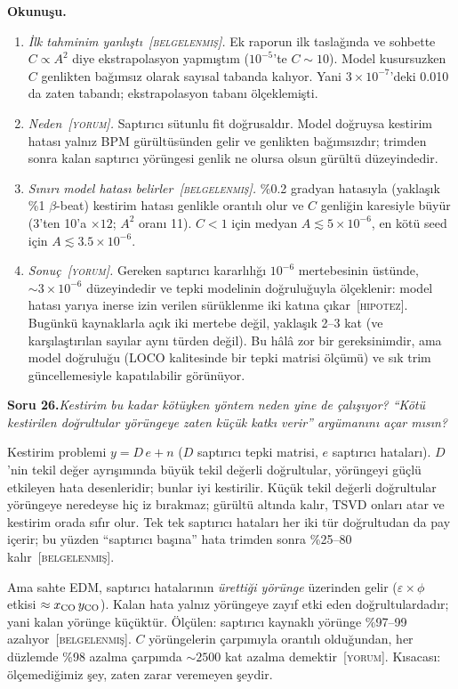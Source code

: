 \documentclass[11pt,a4paper]{article}
\newcommand{\BEL}{\textsc{[belgelenmiş]}}
\newcommand{\YOR}{\textsc{[yorum]}}
\newcommand{\HIP}{\textsc{[hipotez]}}
\newcounter{soru}
\newcommand{\soru}[2]{%
  \par\medskip\noindent\textbf{Soru #1.}\enspace\textit{#2}\par\nopagebreak\smallskip}
\begin{document}
\textbf{Okunuşu.}
\begin{enumerate}[nosep]
\item \emph{İlk tahminim yanlıştı~\BEL.} Ek raporun ilk taslağında ve sohbette $C\propto A^2$ diye
ekstrapolasyon yapmıştım ($10^{-5}$'te $C\sim10$). Model kusursuzken $C$ genlikten bağımsız olarak sayısal
tabanda kalıyor. Yani $3\times10^{-7}$'deki 0.010 da zaten tabandı; ekstrapolasyon tabanı ölçeklemişti.
\item \emph{Neden~\YOR.} Saptırıcı sütunlu fit doğrusaldır. Model doğruysa kestirim hatası yalnız BPM
gürültüsünden gelir ve genlikten bağımsızdır; trimden sonra kalan saptırıcı yörüngesi genlik ne olursa olsun
gürültü düzeyindedir.
\item \emph{Sınırı model hatası belirler~\BEL.} \%0.2 gradyan hatasıyla (yaklaşık \%1 $\beta$-beat) kestirim
hatası genlikle orantılı olur ve $C$ genliğin karesiyle büyür (3'ten 10'a $\times12$; $A^2$ oranı 11).
$C<1$ için medyan $A\lesssim5\times10^{-6}$, en kötü seed için $A\lesssim3.5\times10^{-6}$.
\item \emph{Sonuç~\YOR.} Gereken saptırıcı kararlılığı $10^{-6}$ mertebesinin üstünde, $\sim3\times10^{-6}$
düzeyindedir ve tepki modelinin doğruluğuyla ölçeklenir: model hatası yarıya inerse izin verilen sürüklenme
iki katına çıkar~\HIP. Bugünkü kaynaklarla açık iki mertebe değil, yaklaşık 2--3 kat (ve karşılaştırılan
sayılar aynı türden değil). Bu hâlâ zor bir gereksinimdir, ama model doğruluğu (LOCO kalitesinde bir tepki
matrisi ölçümü) ve sık trim güncellemesiyle kapatılabilir görünüyor.
\end{enumerate}

\soru{26}{Kestirim bu kadar kötüyken yöntem neden yine de çalışıyor? ``Kötü kestirilen doğrultular
yörüngeye zaten küçük katkı verir'' argümanını açar mısın?}

Kestirim problemi $y=D\,e+n$ ($D$ saptırıcı tepki matrisi, $e$ saptırıcı hataları). $D$'nin tekil değer
ayrışımında büyük tekil değerli doğrultular, yörüngeyi güçlü etkileyen hata desenleridir; bunlar iyi
kestirilir. Küçük tekil değerli doğrultular yörüngeye neredeyse hiç iz bırakmaz; gürültü altında kalır,
TSVD onları atar ve kestirim orada sıfır olur. Tek tek saptırıcı hataları her iki tür doğrultudan da pay
içerir; bu yüzden ``saptırıcı başına'' hata trimden sonra \%25--80 kalır~\BEL.

Ama sahte EDM, saptırıcı hatalarının \emph{ürettiği yörünge} üzerinden gelir ($\varepsilon\times\phi$
etkisi $\approx x_{\rm CO}\,y_{\rm CO}$). Kalan hata yalnız yörüngeye zayıf etki eden doğrultulardadır; yani
kalan yörünge küçüktür. Ölçülen: saptırıcı kaynaklı yörünge \%97--99 azalıyor~\BEL. $C$ yörüngelerin
çarpımıyla orantılı olduğundan, her düzlemde \%98 azalma çarpımda $\sim2500$ kat azalma demektir~\YOR.
Kısacası: ölçemediğimiz şey, zaten zarar veremeyen şeydir.
\end{document}
